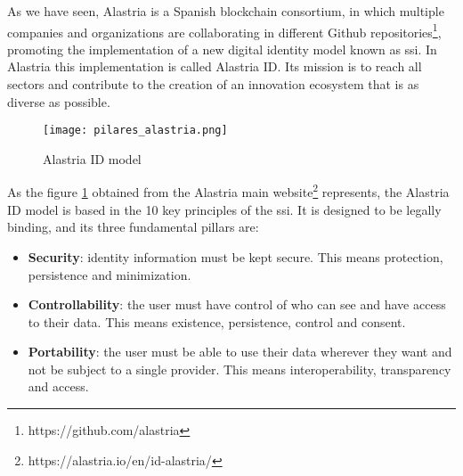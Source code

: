 As we have seen, Alastria is a Spanish blockchain consortium, in which multiple companies and organizations are collaborating in different Github repositories\footnote{https://github.com/alastria}, promoting the implementation of a new digital identity model known as \acrlong{ssi}. In Alastria this implementation is called Alastria ID. Its mission is to reach all sectors and contribute to the creation of an innovation ecosystem that is as diverse as possible. \\

\begin{figure}[h]
    \centering
    \texttt{[image: pilares\_alastria.png]}
    \caption{Alastria ID model}
    \label{fig:pilares_alastria}
\end{figure}

As the figure \ref{fig:pilares_alastria} obtained from the Alastria main website\footnote{https://alastria.io/en/id-alastria/} represents, the Alastria ID model is based in the 10 key principles of the \acrshort{ssi}. It is designed to be legally binding, and its three fundamental pillars are:
\begin{itemize}
    \item \textbf{Security}: identity information must be kept secure. This means protection, persistence and minimization.
    \item \textbf{Controllability}: the user must have control of who can see and have access to their data. This means existence, persistence, control and consent.
    \item \textbf{Portability}: the user must be able to use their data wherever they want and not be subject to a single provider. This means interoperability, transparency and access.
\end{itemize}

